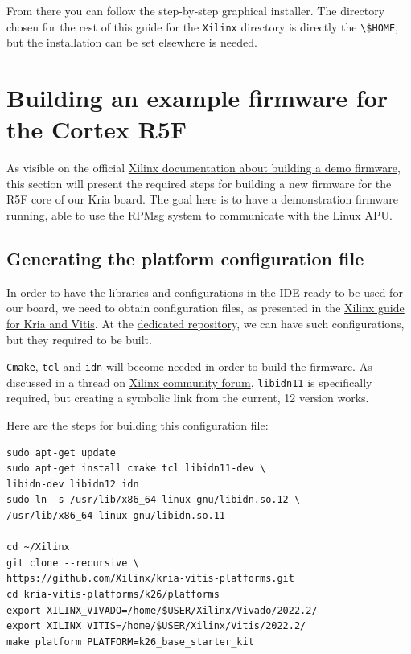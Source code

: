 \documentclass[10pt]{article}
\begin{document}
From there you can follow the step-by-step graphical installer.
The directory chosen for the rest of this guide for the \verb|Xilinx| directory
is directly the \verb|\$HOME|, but the installation can be set elsewhere is needed.


\section{Building an example firmware for the Cortex R5F}
As visible on the official \href{https://xilinx-wiki.atlassian.net/wiki/spaces/A/pages/1837006921/OpenAMP+Base+Hardware+Configurations\#Build-RPU-firmware}{Xilinx documentation about building a demo firmware}, this section will present the required steps for building a new firmware for the R5F core of our Kria board. The goal
here is to have a demonstration firmware running, able to use the RPMsg system to communicate with the Linux APU.

\subsection{Generating the platform configuration file}
In order to have the libraries and configurations in the IDE ready to be used for our board, we need to obtain configuration files, as presented in the 
\href{https://xilinx.github.io/kria-apps-docs/kv260/2022.1/build/html/docs/build_vitis_platform.html?highlight=xsa}{Xilinx guide for Kria and Vitis}. At the \href{https://github.com/Xilinx/kria-vitis-platforms}{dedicated repository}, we can have such configurations, but they required to be built.

\verb|Cmake|, \verb|tcl| and \verb|idn| will become needed in order to build the firmware.
As discussed in a thread on \href{https://support.xilinx.com/s/question/0D52E00006jrzsYSAQ/platform-project-cannot-be-created-on-vitis?language=en\_US}{Xilinx community forum}, \verb|libidn11| is specifically required, but creating a symbolic link from the current, 12 version works.

Here are the steps for building this configuration file:
\begin{tcolorbox}
\begin{verbatim}
sudo apt-get update
sudo apt-get install cmake tcl libidn11-dev \
libidn-dev libidn12 idn
sudo ln -s /usr/lib/x86_64-linux-gnu/libidn.so.12 \
/usr/lib/x86_64-linux-gnu/libidn.so.11

cd ~/Xilinx
git clone --recursive \
https://github.com/Xilinx/kria-vitis-platforms.git
cd kria-vitis-platforms/k26/platforms
export XILINX_VIVADO=/home/$USER/Xilinx/Vivado/2022.2/
export XILINX_VITIS=/home/$USER/Xilinx/Vitis/2022.2/
make platform PLATFORM=k26_base_starter_kit
\end{verbatim}
\end{tcolorbox}
\end{document}
